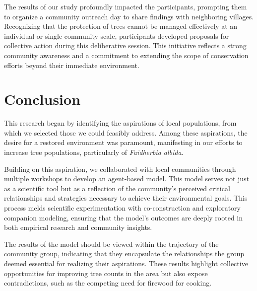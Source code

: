 \documentclass{article}
\begin{document}

The results of our study profoundly impacted the participants, prompting them to organize a community outreach day to share findings with neighboring villages. Recognizing that the protection of trees cannot be managed effectively at an individual or single-community scale, participants developed proposals for collective action during this deliberative session. This initiative reflects a strong community awareness and a commitment to extending the scope of conservation efforts beyond their immediate environment.

\section{Conclusion}


This research began by identifying the aspirations of local populations, from which we selected those we could feasibly address. Among these aspirations, the desire for a restored environment was paramount, manifesting in our efforts to increase tree populations, particularly of \textit{Faidherbia albida}.

Building on this aspiration, we collaborated with local communities through multiple workshops to develop an agent-based model. This model serves not just as a scientific tool but as a reflection of the community's perceived critical relationships and strategies necessary to achieve their environmental goals. This process melds scientific experimentation with co-construction and exploratory companion modeling, ensuring that the model's outcomes are deeply rooted in both empirical research and community insights.

The results of the model should be viewed within the trajectory of the community group, indicating that they encapsulate the relationships the group deemed essential for realizing their aspirations. These results highlight collective opportunities for improving tree counts in the area but also expose contradictions, such as the competing need for firewood for cooking.
\end{document}
